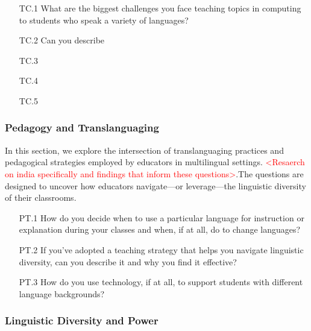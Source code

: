 \begin{enumerate}
  \item[TC.1] What are the biggest challenges you face teaching topics in
    computing to students who speak a variety of languages?
  \item[TC.2] Can you describe 
  \item[TC.3] 
  \item[TC.4] 
  \item[TC.5] 
\end{enumerate}

\subsubsection{Pedagogy and Translanguaging}\label{subsubsec:pedagogy-and-translanguaging}

In this section, we explore the intersection of translanguaging practices and
pedagogical strategies employed by educators in multilingual settings.
\textcolor{red}{<Resaerch on india specifically and findings that inform these
questions>}.The questions are designed to uncover how educators navigate---or
leverage---the linguistic diversity of their classrooms.
\begin{enumerate}
  \item[PT.1] How do you decide when to use a particular language for
    instruction or explanation during your classes and when, if at all, do
    to change languages?
  \item[PT.2] If you've adopted a teaching strategy that helps you navigate
    linguistic diversity, can you describe it and why you find it effective?
  \item[PT.3] How do you use technology, if at all, to support students with
    different language backgrounds?
\end{enumerate}

\subsubsection{Linguistic Diversity and Power}\label{subsubsec:linguistic-diversity-and-power}

